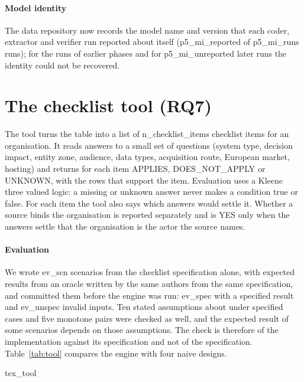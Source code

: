 \documentclass[conference]{IEEEtran}
\begin{document}
\paragraph{Model identity} The data repository now records the model name and version that each coder, extractor and verifier run reported about itself ({{p5_mi_reported}} of {{p5_mi_runs}} runs); for the runs of earlier phases and for {{p5_mi_unreported}} later runs the identity could not be recovered.

\section{The checklist tool (RQ7)}\label{sec:tool}
The tool turns the table into a list of {{n_checklist_items}} checklist items for an organisation. It reads answers to a small set of questions (system type, decision impact, entity zone, audience, data types, acquisition route, European market, hosting) and returns for each item APPLIES, DOES\_NOT\_APPLY or UNKNOWN, with the rows that support the item. Evaluation uses a Kleene three valued logic: a missing or unknown answer never makes a condition true or false. For each item the tool also says which answers would settle it. Whether a source binds the organisation is reported separately and is YES only when the answers settle that the organisation is the actor the source names.

\paragraph{Evaluation} We wrote {{ev_scn}} scenarios from the checklist specification alone, with expected results from an oracle written by the same authors from the same specification, and committed them before the engine was run: {{ev_spec}} with a specified result and {{ev_unspec}} invalid inputs. Ten stated assumptions about under specified cases and five monotone pairs were checked as well, and the expected result of some scenarios depends on those assumptions. The check is therefore of the implementation against its specification and not of the specification. Table~\ref{tab:tool} compares the engine with four naive designs.

\begin{table}[t]\centering\small
{{tex_tool}}
\caption{Item level results over {{ev_spec}} specified scenarios ({{ev_dec}} decisions). Wrongly excluded: said not applicable where applicable or unknown was expected. Wrongly applied: said applicable where not applicable or unknown was expected. Unknown: the engine returned unknown.}\label{tab:tool}
\end{table}
\end{document}
